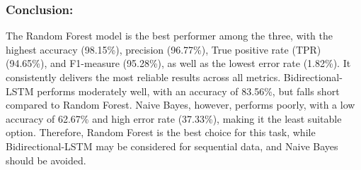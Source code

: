 \documentclass[11pt]{article}
\makeatletter
\newcommand{\boxspacing}{\kern\kvtcb@left@rule\kern\kvtcb@boxsep}
\newcommand{\prompt}[4]{
        {\ttfamily\llap{{\color{#2}[#3]:\hspace{3pt}#4}}\vspace{-\baselineskip}}
    }
\makeatother
\begin{document}
    \subsubsection{Conclusion:}\label{conclusion}

The Random Forest model is the best performer among the three, with the
highest accuracy (98.15\%), precision (96.77\%), True positive rate
(TPR) (94.65\%), and F1-measure (95.28\%), as well as the lowest error
rate (1.82\%). It consistently delivers the most reliable results across
all metrics. Bidirectional-LSTM performs moderately well, with an
accuracy of 83.56\%, but falls short compared to Random Forest. Naive
Bayes, however, performs poorly, with a low accuracy of 62.67\% and high
error rate (37.33\%), making it the least suitable option. Therefore,
Random Forest is the best choice for this task, while Bidirectional-LSTM
may be considered for sequential data, and Naive Bayes should be
avoided.

    \begin{tcolorbox}[breakable, size=fbox, boxrule=1pt, pad at break*=1mm,colback=cellbackground, colframe=cellborder]
\prompt{In}{incolor}{ }{\boxspacing}
\begin{Verbatim}[commandchars=\\\{\}]

\end{Verbatim}
\end{tcolorbox}


    
    
    
\end{document}
